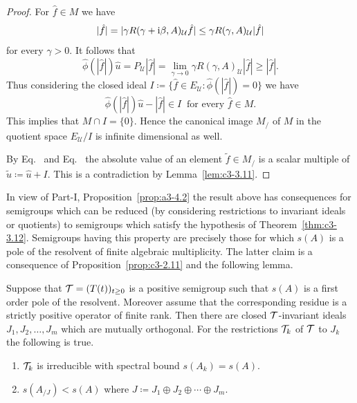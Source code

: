 \begin{proof}
For $\hat{f} \in M$ we have 
%
\[
	|\hat{f}| = |\gamma R(\gamma+\im\beta,A)_{\mathcal{U}}\hat{f}| \leq \gamma R(\gamma,A)_{\mathcal{U}}|\hat{f}|
\]
%
for every $\gamma > 0$.
It follows that 
%
\[
	\hat{\phi}(|\hat{f}|)\hat{u} = P_{\mathcal{U}}|\hat{f}| = \lim_{\gamma\to 0}\gamma R(\gamma,A)_{\mathcal{U}}|\hat{f}| \geq |\hat{f}| .
\]
%
Thus considering the closed ideal $I \coloneq \{\hat{f} \in E_{\mathcal{U}} \colon \hat{\phi}(|\hat{f}|) = 0\}$ we have
	\begin{equation}\label{eq:c3-3.17}
		\hat{\phi}(|\hat{f}|)\hat{u} - |\hat{f}| \in I \ \text{ for every } \hat{f} \in M .
	\end{equation}
	This implies that $M \cap I = \{0\}$. 
	Hence the canonical image $M_/$ of\/ $M$ in the quotient space $E_{\mathcal{U}}/I$ is infinite dimensional as well. 
	
	By Eq.~ and Eq.~ the absolute value of an element $\tilde{f} \in M_/$ is a scalar multiple of\/ $\tilde{u} \coloneq \hat{u} + I$. 
	This is a contradiction by Lemma~\ref{lem:c3-3.11}.
\end{proof}
In view of Part-I, Proposition~\ref{prop:a3-4.2} the result above has consequences for semigroups which can be reduced (by considering restrictions to invariant ideals or quotients) to semigroups which satisfy the hypothesis of Theorem~\ref{thm:c3-3.12}. 
Semigroups having this property are precisely those for which $s(A)$ is a pole of the resolvent of finite algebraic multiplicity. 
The latter claim is a consequence of Proposition~\ref{prop:c3-2.11} and the following lemma.
\begin{lemma}\label{lem:c3-3.13}
	Suppose that $\TT = (T(t))_{t  \geq 0}$ is a positive semigroup such that $s(A)$ is a first order pole of the resolvent. 
	Moreover assume that the corresponding residue is a strictly positive operator of finite rank.
	Then there are closed $\mathcal{T}$-invariant ideals $J_{1},J_{2},\ldots,J_{m}$ which are mutually orthogonal. 
	For the restrictions  $\mathcal{T}_{k}$ of\/ $\mathcal{T}$ to $J_{k}$ the following is true.
	\begin{enumerate}[\upshape (i)]
		\item $\mathcal{T}_{k}$ is irreducible with spectral bound $s(A_k) = s(A)$. 
		\item $s(A_{/J}) < s(A)$  where $J \coloneq  J_{1}\oplus J_{2}\oplus \cdots \oplus J_{m}$.
	\end{enumerate}
\end{lemma}
